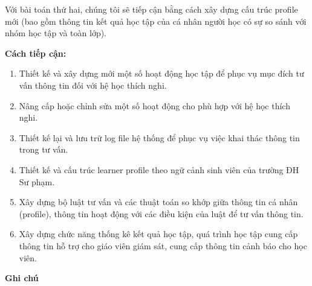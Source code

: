 Với bài toán thứ hai, chúng tôi sẽ tiếp cận bằng cách xây dựng cấu trúc profile mới (bao gồm thông tin kết quả học tập của cá nhân người học có sự so sánh với nhóm học tập và toàn lớp).

\textbf{Cách tiếp cận:}
\begin{enumerate}
    \item Thiết kế và xây dựng mới một số hoạt động học tập để phục vụ mục đích tư vấn thông tin đối với hệ học thích nghi.
    \item Nâng cấp hoặc chỉnh sửa một số hoạt động cho phù hợp với hệ học thích nghi.
    \item Thiết kế lại và lưu trữ log file hệ thống để phục vụ việc khai thác thông tin trong tư vấn.
    \item Thiết kế và cấu trúc learner profile theo ngữ cảnh sinh viên của trường ĐH Sư phạm.
    \item Xây dựng bộ luật tư vấn và các thuật toán so khớp giữa thông tin cá nhân (profile), thông tin hoạt động với các điều kiện của luật để tư vấn thông tin.
    \item Xây dựng chức năng thống kê kết quả học tập, quá trình học tập cung cấp thông tin hỗ trợ cho giáo viên giám sát, cung cấp thông tin cảnh báo cho học viên.
\end{enumerate}

\textbf{Ghi chú}